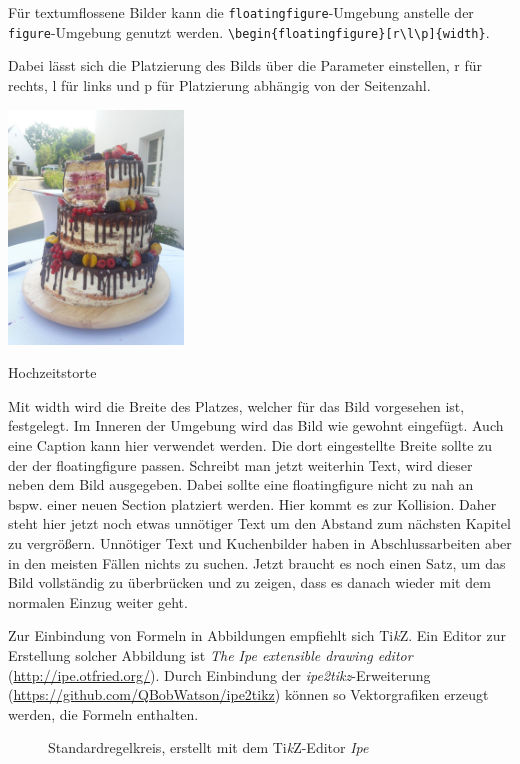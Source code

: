 Für textumflossene Bilder kann die \texttt{floatingfigure}-Umgebung anstelle der \texttt{figure}-Umgebung genutzt werden. 
\verb+\begin{floatingfigure}[r\l\p]{width}+.


Dabei lässt sich die Platzierung des Bilds über die Parameter einstellen, r für rechts, l für links und p für Platzierung abhängig von der Seitenzahl.
\begin{floatingfigure}[l]{0.4\textwidth}
\includegraphics[width = 0.35\textwidth]{Bilder/hochzeitstorte}
\caption{Hochzeitstorte}
\end{floatingfigure} 
Mit width wird die Breite des Platzes, welcher für das Bild vorgesehen ist, festgelegt. 
Im Inneren der Umgebung wird das Bild wie gewohnt eingefügt. Auch eine Caption kann hier verwendet werden.
Die dort eingestellte Breite sollte zu der der floatingfigure passen. 
Schreibt man jetzt weiterhin Text, wird dieser neben dem Bild ausgegeben. Dabei sollte eine floatingfigure nicht zu nah an bspw. einer neuen Section platziert werden. Hier kommt es zur Kollision. Daher steht hier jetzt noch etwas unnötiger Text um den Abstand zum nächsten Kapitel zu vergrößern. Unnötiger Text und Kuchenbilder haben in Abschlussarbeiten aber in den meisten Fällen nichts zu suchen. Jetzt braucht es noch einen Satz, um das Bild vollständig zu überbrücken und zu zeigen, dass es danach wieder mit dem normalen Einzug weiter geht. 

Zur Einbindung von Formeln in Abbildungen empfiehlt sich Ti\textit{k}Z. Ein Editor zur Erstellung solcher Abbildung ist \emph{The Ipe extensible drawing editor} (\url{http://ipe.otfried.org/}). Durch Einbindung der \emph{ipe2tikz}-Erweiterung (\url{https://github.com/QBobWatson/ipe2tikz}) können so Vektorgrafiken erzeugt werden, die Formeln enthalten.
\begin{figure}[h]
	\centering
	\begin{tikzpicture}[scale=1.0, every node/.style={scale=1.0}]
	
	\end{tikzpicture}
	\caption{Standardregelkreis, erstellt mit dem Ti\textit{k}Z-Editor \emph{Ipe}} \label{fig:Standardregelkreis}
\end{figure}

